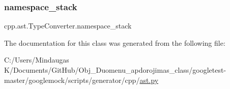 \subsubsection{\texorpdfstring{namespace\_stack}{namespace\_stack}}
{\footnotesize\ttfamily cpp.\+ast.\+Type\+Converter.\+namespace\+\_\+stack}



The documentation for this class was generated from the following file\+:\begin{DoxyCompactItemize}
\item 
C\+:/\+Users/\+Mindaugas K/\+Documents/\+Git\+Hub/\+Obj\+\_\+\+Duomenu\+\_\+apdorojimas\+\_\+class/googletest-\/master/googlemock/scripts/generator/cpp/\mbox{\hyperlink{googletest-master_2googlemock_2scripts_2generator_2cpp_2ast_8py}{ast.\+py}}\end{DoxyCompactItemize}
